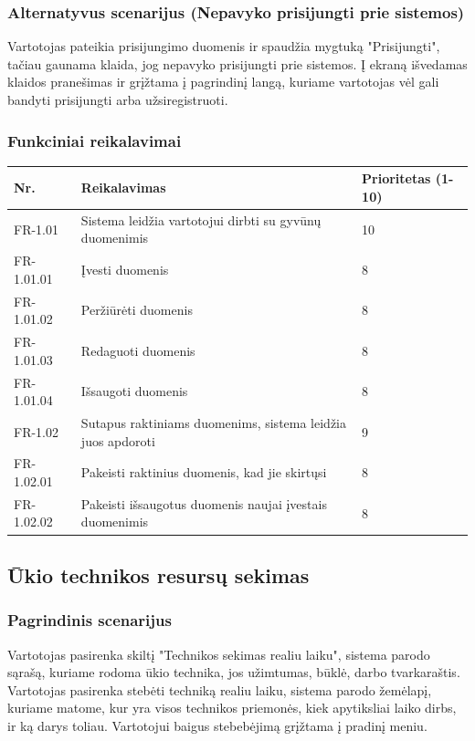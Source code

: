 \documentclass[oneside]{VUMIFPSkursinis}
\begin{document}
\subsubsection{Alternatyvus scenarijus (Nepavyko prisijungti prie sistemos)}
	Vartotojas pateikia prisijungimo duomenis ir spaudžia mygtuką "Prisijungti", tačiau gaunama klaida, jog nepavyko prisijungti prie sistemos. Į ekraną išvedamas klaidos pranešimas ir grįžtama į pagrindinį langą, kuriame vartotojas vėl gali bandyti prisijungti arba užsiregistruoti.
\subsubsection{Funkciniai reikalavimai}
\begin{table}[htbp]
	\begin{tabularx}{1\textwidth}{ |P{2.5cm}|X|P{3cm }| } \hline
    Nr. & Reikalavimas &  Prioritetas (1-10)  \\   \hline 
    FR-1.01 & Sistema leidžia vartotojui dirbti su gyvūnų duomenimis & 10  \\   \hline
		FR-1.01.01 & Įvesti duomenis & 8 \\ \hline
		FR-1.01.02 & Peržiūrėti duomenis & 8 \\ \hline
		FR-1.01.03 & Redaguoti duomenis & 8 \\ \hline
		FR-1.01.04 & Išsaugoti duomenis & 8 \\ \hline
    FR-1.02 & Sutapus raktiniams duomenims, sistema leidžia juos apdoroti & 9   \\   \hline
		FR-1.02.01 & Pakeisti raktinius duomenis, kad jie skirtųsi & 8 \\ \hline
		FR-1.02.02 & Pakeisti išsaugotus duomenis naujai įvestais duomenimis & 8 \\ \hline
	\end{tabularx}
\end{table}                                    %

\subsection{Ūkio technikos resursų sekimas}
\subsubsection{Pagrindinis scenarijus}
	Vartotojas pasirenka skiltį "Technikos sekimas realiu laiku", sistema parodo sąrašą, kuriame rodoma ūkio technika, jos užimtumas, būklė, darbo tvarkaraštis. Vartotojas pasirenka stebėti techniką realiu laiku, sistema parodo žemėlapį, kuriame matome, kur yra visos technikos priemonės, kiek apytiksliai laiko dirbs, ir ką darys toliau. Vartotojui baigus stebebėjimą grįžtama į pradinį meniu.
\end{document}
